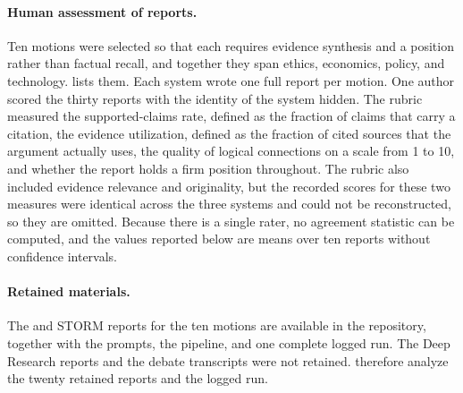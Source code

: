 \paragraph{Human assessment of reports.}
Ten motions were selected so that each requires evidence synthesis and a position rather than factual recall, and together they span ethics, economics, policy, and technology.  lists them. Each system wrote one full report per motion. One author scored the thirty reports with the identity of the system hidden. The rubric measured the supported-claims rate, defined as the fraction of claims that carry a citation, the evidence utilization, defined as the fraction of cited sources that the argument actually uses, the quality of logical connections on a scale from 1 to 10, and whether the report holds a firm position throughout. The rubric also included evidence relevance and originality, but the recorded scores for these two measures were identical across the three systems and could not be reconstructed, so they are omitted. Because there is a single rater, no agreement statistic can be computed, and the values reported below are means over ten reports without confidence intervals.

\paragraph{Retained materials.}
The \sys{} and STORM reports for the ten motions are available in the repository, together with the prompts, the pipeline, and one complete logged run. The Deep Research reports and the debate transcripts were not retained.  therefore analyze the twenty retained reports and the logged run.
